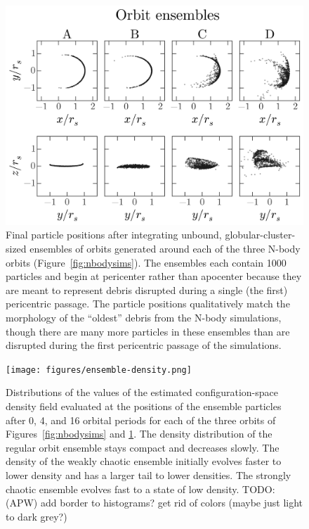 \documentclass[letterpaper,12pt,preprint]{aastex}
\newcommand{\todo}[2]{{\color{red} TODO: (\MakeUppercase{#1}) #2}}
\begin{document}
\begin{figure}[p]
\begin{center}
\includegraphics[width=\textwidth]{figures/ensembles.png}
\caption{Final particle positions after integrating unbound, globular-cluster-sized ensembles of orbits generated around each of the three N-body orbits (Figure~\ref{fig:nbodysims}). The ensembles each contain 1000 particles and begin at pericenter rather than apocenter because they are meant to represent debris disrupted during a single (the first) pericentric passage. The particle positions qualitatively match the morphology of the ``oldest'' debris from the N-body simulations, though there are many more particles in these ensembles than are disrupted during the first pericentric passage of the simulations. } 
\label{fig:ensembles}
\end{center}
\end{figure}

\clearpage
\begin{figure}[p]
\begin{center}
\texttt{[image: figures/ensemble-density.png]}
\caption{ Distributions of the values of the estimated configuration-space density field evaluated at the positions of the ensemble particles after 0, 4, and 16 orbital periods for each of the three orbits of Figures~\ref{fig:nbodysims} and \ref{fig:ensembles}. The density distribution of the regular orbit ensemble stays compact and decreases slowly. The density of the weakly chaotic ensemble initially evolves faster to lower density and has a larger tail to lower densities. The strongly chaotic ensemble evolves fast to a state of low density. \todo{apw}{add border to histograms? get rid of colors (maybe just light to dark grey?)}} \label{fig:ensemble-density}
\end{center}
\end{figure}
\end{document}
